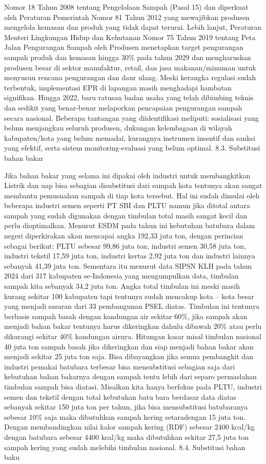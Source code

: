 \documentclass[
  letterpaper,
  DIV=11,
  numbers=noendperiod]{scrreprt}
\begin{document}
Nomor 18 Tahun 2008 tentang Pengelolaan Sampah (Pasal 15) dan diperkuat
oleh Peraturan Pemerintah Nomor 81 Tahun 2012 yang mewajibkan produsen
mengelola kemasan dan produk yang tidak dapat terurai. Lebih lanjut,
Peraturan Menteri Lingkungan Hidup dan Kehutanan Nomor 75 Tahun 2019
tentang Peta Jalan Pengurangan Sampah oleh Produsen menetapkan target
pengurangan sampah produk dan kemasan hingga 30\% pada tahun 2029 dan
mengharuskan produsen besar di sektor manufaktur, retail, dan jasa
makanan/minuman untuk menyusun rencana pengurangan dan daur ulang. Meski
kerangka regulasi sudah terbentuk, implementasi EPR di lapangan masih
menghadapi hambatan signifikan. Hingga 2022, baru ratusan badan usaha
yang telah dibimbing teknis dan sedikit yang benar-benar melaporkan
pencapaian pengurangan sampah secara nasional. Beberapa tantangan yang
diidentifikasi meliputi: sosialisasi yang belum menjangkau seluruh
produsen, dukungan kelembagaan di wilayah kabupaten/kota yang belum
memadai, kurangnya instrumen insentif dan sanksi yang efektif, serta
sistem monitoring-evaluasi yang belum optimal. 8.3. Substitusi bahan
bakar

Jika bahan bakar yang selama ini dipakai oleh industri untuk
membangkitkan Listrik dan uap bisa sebagian disubstitusi dari sampah
kota tentunya akan sangat membantu pemusnahan sampah di tiap kota
tersebut. Hal ini sudah dimulai oleh beberapa industri semen seperti PT
SBI dan PLTU namun jika ditotal antara sampah yang sudah digunakan
dengan timbulan total masih sangat kecil dan perlu dioptimalkan. Menurut
ESDM pada tahun ini kebutuhan batubara dalam negeri diperkirakan akan
mencapai angka 192,33 juta ton, dengan perincian sebagai berikut: PLTU
sebesar 99,86 juta ton, industri semen 30,58 juta ton, industri tekstil
17,59 juta ton, industri kertas 2,92 juta ton dan industri lainnya
sebanyak 41,39 juta ton. Sementara itu menurut data SIPSN KLH pada tahun
2024 dari 317 kabupaten se-Indonesia yang mengumpulkan data, timbulan
sampah kita sebanyak 34,2 juta ton. Angka total timbulan ini meski masih
kurang sekitar 100 kabupaten tapi tentunya sudah mencakup kota -- kota
besar yang menjadi sasaran dari 33 pembangunan PSEL diatas. Timbulan ini
tentunya berbasis sampah basah dengan kandungan air sekitar 60\%, jika
sampah akan menjadi bahan bakar tentunya harus dikeringkan dahulu
dibawah 20\% atau perlu dikurangi sekitar 40\% kandungan airnya.
Hitungan kasar misal timbulan nasional 40 juta ton sampah basah jika
dikeringkan dan siap menjadi bahan bakar akan menjadi sekitar 25 juta
ton saja. Bisa dibayangkan jika semua pembangkit dan industri pemakai
batubara terbesar bisa mensubstitusi sebagian saja dari kebutuhan bahan
bakarnya dengan sampah tentu lebih dari separo permaslahan timbulan
sampah bisa diatasi. Misalkan kita hanya berfokus pada PLTU, industri
semen dan tekstil dengan total kebutuhan batu bara berdasar data diatas
sebanyak sekitar 150 juta ton per tahun, jika bisa mensubstitusi
batubaranya sebesar 10\% saja maka dibutuhkan sampah kering setaradengan
15 juta ton. Dengan membandingkan nilai kalor sampah kering (RDF)
sebesar 2400 kcal/kg dengan batubara sebesar 4400 kcal/kg maka
dibutuhkan sekitar 27,5 juta ton sampah kering yang sudah melebihi
timbulan nasional. 8.4. Substitusi bahan baku
\end{document}
